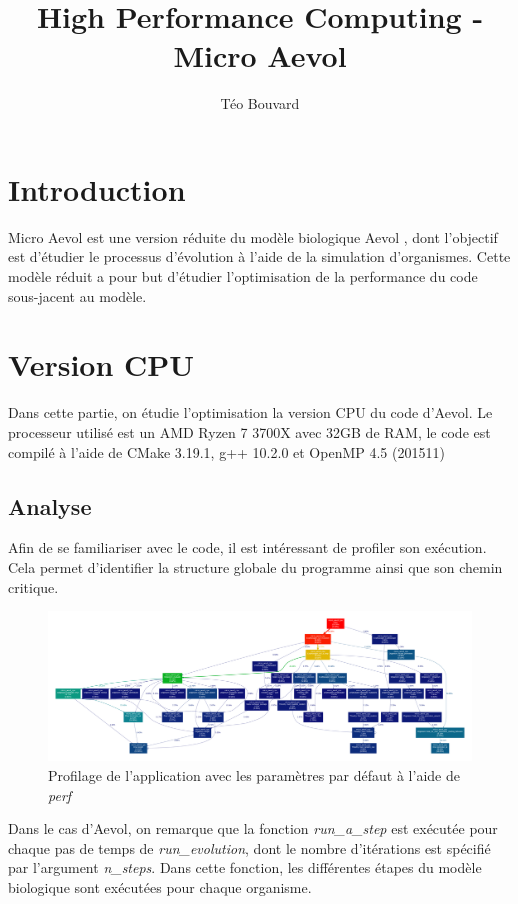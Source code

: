 \documentclass[a4paper, 10pt, twoside]{article}
\begin{document}
\title{High Performance Computing - Micro Aevol}
\author{T\'eo Bouvard}
\maketitle

\section{Introduction}

Micro Aevol est une version réduite du modèle biologique Aevol \cite{aevol}, dont l'objectif est d'étudier le processus d'évolution à l'aide de la simulation d'organismes. Cette modèle réduit a pour but d'étudier l'optimisation de la performance du code sous-jacent au modèle.

\section{Version CPU}

Dans cette partie, on étudie l'optimisation la version CPU du code d'Aevol.
Le processeur utilisé est un AMD Ryzen 7 3700X avec 32GB de RAM, le code est compilé à l'aide de CMake 3.19.1, g++ 10.2.0 et OpenMP 4.5 (201511)

\subsection{Analyse}

Afin de se familiariser avec le code, il est intéressant de profiler son exécution. Cela permet d'identifier la structure globale du programme ainsi que son chemin critique.

\begin{figure}[htpb]
	\includegraphics[width=\linewidth]{img/profile_aevol.pdf}
	\caption{Profilage de l'application avec les paramètres par défaut à l'aide de \textit{perf}}
\end{figure}

Dans le cas d'Aevol, on remarque que la fonction \textit{run\_a\_step} est exécutée pour chaque pas de temps de \textit{run\_evolution}, dont le nombre d'itérations est spécifié par l'argument \textit{n\_steps}.
Dans cette fonction, les différentes étapes du modèle biologique sont exécutées pour chaque organisme.
\end{document}
